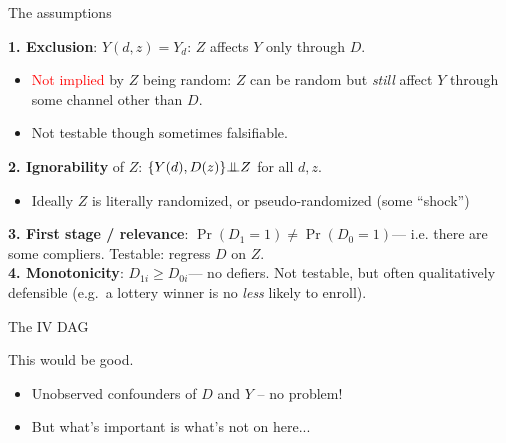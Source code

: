 \documentclass[xcolor=dvipsnames]{beamer}
\newcommand{\indep}{{\bot\negthickspace\negthickspace\bot}}
\begin{document}
 \begin{frame}{The assumptions}
 \small

 \textbf{1. Exclusion}: $Y(d,z) = Y_d$: $Z$ affects $Y$ only through $D$. 
 \begin{itemize}
 \item \textcolor{Red}{Not implied} by $Z$ being random: $Z$ can be random but \textit{still} affect $Y$ through some channel other than $D$.
 \item Not testable though sometimes falsifiable.  
 \end{itemize} 
 \medskip

 \textbf{2. Ignorability} of $Z$: $\{Y(d), D(z)\} \indep Z$ for all $d,z$. 
 \begin{itemize}
 \item Ideally $Z$ is literally randomized, or pseudo-randomized (some ``shock'')
 \end{itemize} 
 \medskip

 \textbf{3. First stage / relevance}:  $\Pr(D_{1}=1)\neq \Pr(D_{0}=1)$\;---\; i.e. there are some compliers. Testable: regress $D$ on $Z$.  \\

 \medskip
 \textbf{4. Monotonicity}: $D_{1i}\geq D_{0i}$\;---\; no defiers. Not testable, but often qualitatively defensible (e.g.\ a lottery winner is no \textit{less} likely to enroll).
 \end{frame}

\begin{frame}{The IV DAG}
\begin{center}
\end{center}
 This would be good.
\small
\begin{itemize}
  \item Unobserved confounders of $D$ and $Y$ -- no problem!
  \item But what's important is what's not on here...
\end{itemize}
\medskip
\end{frame}
\end{document}
